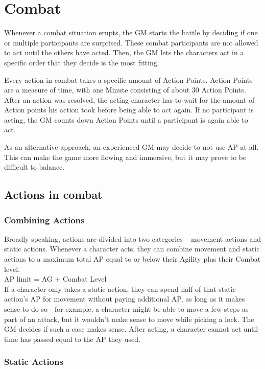 \chapter{Combat}\label{ch:combat}
Whenever a combat situation erupts, the GM starts the battle by deciding if one or multiple participants are surprised.
These combat participants are not allowed to act until the others have acted.
Then, the GM lets the characters act in a specific order that they decide is the most fitting.

Every action in combat takes a specific amount of Action Points.
Action Points are a measure of time, with one Minute consisting of about 30 Action Points.
After an action was resolved, the acting character has to wait for the amount of Action points his action took before being able to act again.
If no participant is acting, the GM counts down Action Points until a participant is again able to act.

As an alternative approach, an experienced GM may decide to not use AP at all.
This can make the game more flowing and immersive, but it may prove to be difficult to balance.


\section{Actions in combat}\label{sec:combatActions}

\subsection{Combining Actions}\label{subsec:multipleCombatActions}
Broadly speaking, actions are divided into two categories -- movement actions and static actions.
Whenever a character acts, they can combine movement and static actions to a maximum total AP equal to or below their Agility plus their Combat level.\\
AP limit = AG + Combat Level\\
If a character only takes a static action, they can spend half of that static action's AP for movement without paying additional AP, as long as it makes sense to do so - for example, a character might be able to move a few steps as part of an attack, but it wouldn't make sense to move while picking a lock.
The GM decides if such a case makes sense.
After acting, a character cannot act until time has passed equal to the AP they used.

\subsection{Static Actions}\label{subsec:staticCombatActions}

